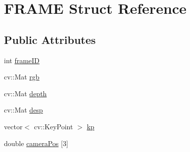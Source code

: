 \hypertarget{struct_f_r_a_m_e}{\section{F\-R\-A\-M\-E Struct Reference}
\label{struct_f_r_a_m_e}
}
\subsection*{Public Attributes}
\begin{DoxyCompactItemize}
\item 
int \hyperlink{struct_f_r_a_m_e_a6db11cfd8c965393d608aaf485574fd4}{frame\-I\-D}
\item 
cv\-::\-Mat \hyperlink{struct_f_r_a_m_e_a1a7cfb8b9de8861c69130e37981d7e7e}{rgb}
\item 
cv\-::\-Mat \hyperlink{struct_f_r_a_m_e_a2252df16c853a9b54e36d0bbdbe14a92}{depth}
\item 
cv\-::\-Mat \hyperlink{struct_f_r_a_m_e_aa85154a4977026ba1944bc1fe14c05c6}{desp}
\item 
vector$<$ cv\-::\-Key\-Point $>$ \hyperlink{struct_f_r_a_m_e_ab825c7b736d6770f78563af562831aba}{kp}
\item 
double \hyperlink{struct_f_r_a_m_e_a6b71c4deb9405c3d03ec1477fa6dea43}{camera\-Pos} \mbox{[}3\mbox{]}
\end{DoxyCompactItemize}


